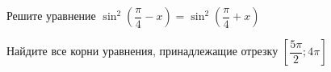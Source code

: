 \begin{ex}
	\begin{condition}
		\begin{enumcols}[label=\asbuk*)]
			\item Решите уравнение \(  \sin^2{\left(\dfrac{\pi}{4} - x\right)}=\sin^2{\left(\dfrac{\pi}{4} + x\right)}  \)
			\item Найдите все корни уравнения, принадлежащие отрезку \( \left[\dfrac{5\pi}{2};4\pi\right] \)
		\end{enumcols}
	\end{condition}
\end{ex}